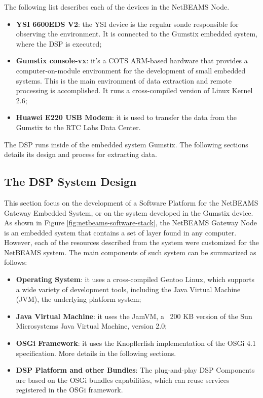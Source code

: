 The following list describes each of the devices in the NetBEAMS Node.

\begin{itemize}
  \item \textbf{YSI 6600EDS V2}: the YSI device is the regular sonde
  responsible for observing the environment. It is connected to the Gumstix
  embedded system, where the DSP is executed;
  \item \textbf{Gumstix console-vx}: it's a COTS ARM-based hardware that
  provides a computer-on-module environment for the development of small
  embedded systems. This is the main environment of data extraction and remote
  processing is accomplished. It runs a cross-compiled version of Linux Kernel
  2.6;
  \item \textbf{Huawei E220 USB Modem}: it is used to transfer the data from the
  Gumstix to the RTC Labs Data Center.
\end{itemize} 

The DSP runs inside of the embedded system Gumstix. The following sections
details its design and process for extracting data.

\subsection{The DSP System Design}

This section focus on the development of a Software Platform for the NetBEAMS
Gateway Embedded System, or on the system developed in the Gumstix device. As
shown in Figure \ref{fig:netbeams-software-stack}, the NetBEAMS Gateway Node is
an embedded system that contains a set of layer found in any computer.
However, each of the resources described from the system were customized for
the NetBEAMS system. The main components of such system can be summarized as
follows:

\begin{itemize}
  \item \textbf{Operating System}: it uses a cross-compiled Gentoo Linux, which
  supports a wide variety of development tools, including the Java Virtual Machine
  (JVM), the underlying platform system;
  \item \textbf{Java Virtual Machine}: it uses the JamVM, a ~200 KB version of
  the Sun Microsystems Java Virtual Machine, version 2.0;
  \item \textbf{OSGi Framework}: it uses the Knopflerfish implementation of the
  OSGi 4.1 specification. More details in the following sections.
  \item \textbf{DSP Platform and other Bundles}: The plug-and-play DSP
  Components are based on the OSGi bundles capabilities, which can reuse
  services registered in the OSGi framework.
\end{itemize}

